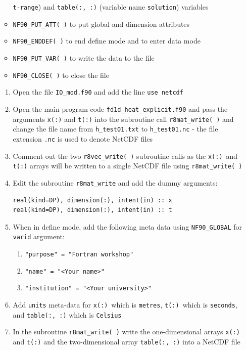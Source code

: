 \documentclass[12pt]{article}
\begin{document}
\begin{enumerate}
\begin{itemize}
  \texttt{t-range}) and \texttt{table(:, :)} (variable name \texttt{solution}) variables
\item\texttt{NF90\_PUT\_ATT( )} to put global and dimension attributes
\item\texttt{NF90\_ENDDEF( )} to end define mode and to enter data mode
\item\texttt{NF90\_PUT\_VAR( )} to write the data to the file
\item\texttt{NF90\_CLOSE( )} to close the file
\end{itemize}
\begin{enumerate}
\item Open the file \texttt{IO\_mod.f90} and add the line \texttt{use netcdf}
\item Open the main program code \texttt{fd1d\_heat\_explicit.f90} and pass the arguments \texttt{x(:)} and
  \texttt{t(:)} into the subroutine call \texttt{r8mat\_write( )} and change the file name from \texttt{h\_test01.txt}
  to \texttt{h\_test01.nc} - the file extension \texttt{.nc} is used to denote NetCDF files
\item Comment out the two \texttt{r8vec\_write( )} subroutine calls as the \texttt{x(:)}\ and \texttt{t(:)} arrays will
  be written to a single NetCDF file using \texttt{r8mat\_write( )}
\item Edit the subroutine \texttt{r8mat\_write} and add the dummy arguments:
\begin{verbatim}
real(kind=DP), dimension(:), intent(in) :: x
real(kind=DP), dimension(:), intent(in) :: t
\end{verbatim}
\item When in define mode, add the following meta data using \texttt{NF90\_GLOBAL} for \texttt{varid} argument:
  \begin{enumerate}
  \item\texttt{"purpose" = "Fortran workshop"}
  \item\texttt{"name" = "<Your name>"}
  \item\texttt{"institution" = "<Your university>"} 
  \end{enumerate}
\item Add \texttt{units} meta-data for \texttt{x(:)}\ which is \texttt{metres}, \texttt{t(:)}\ which is \texttt{seconds}, and
  \texttt{table(:, :)} which is \texttt{Celsius}
\item In the subroutine \texttt{r8mat\_write( )} write the one-dimensional arrays \texttt{x(:)} and \texttt{t(:)} and the
  two-dimensional array \texttt{table(:, :)} into a NetCDF file

\end{enumerate}
\end{enumerate}
\end{document}
